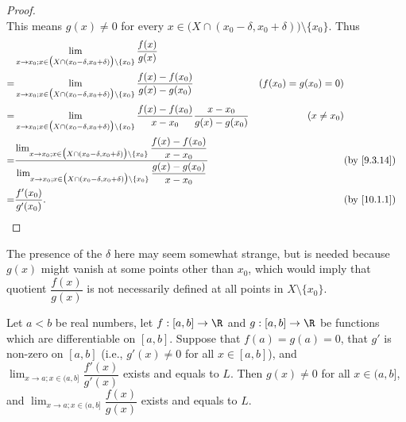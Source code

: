 \begin{proof}
\[  \]
  This means \(g(x) \neq 0\) for every \(x \in \big(X \cap (x_0 - \delta, x_0 + \delta)\big) \setminus \{x_0\}\).
  Thus
  \begin{align*}
      & \lim_{x \to x_0 ; x \in \big(X \cap (x_0 - \delta, x_0 + \delta)\big) \setminus \{x_0\}} \dfrac{f(x)}{g(x)}                                                                                                                                                                                                  \\
    = & \lim_{x \to x_0 ; x \in \big(X \cap (x_0 - \delta, x_0 + \delta)\big) \setminus \{x_0\}} \dfrac{f(x) - f(x_0)}{g(x) - g(x_0)}                                                                                                                            & (f(x_0) = g(x_0) = 0)                             \\
    = & \lim_{x \to x_0 ; x \in \big(X \cap (x_0 - \delta, x_0 + \delta)\big) \setminus \{x_0\}} \dfrac{f(x) - f(x_0)}{x - x_0} \dfrac{x - x_0}{g(x) - g(x_0)}                                                                                                   & (x \neq x_0)                                      \\
    = & \dfrac{\lim_{x \to x_0 ; x \in \big(X \cap (x_0 - \delta, x_0 + \delta)\big) \setminus \{x_0\}} \dfrac{f(x) - f(x_0)}{x - x_0}}{\lim_{x \to x_0 ; x \in \big(X \cap (x_0 - \delta, x_0 + \delta)\big) \setminus \{x_0\}} \dfrac{g(x) - g(x_0)}{x - x_0}} &                       & \text{(by \cref{9.3.14})} \\
    = & \dfrac{f'(x_0)}{g'(x_0)}.                                                                                                                                                                                                                                &                       & \text{(by \cref{10.1.1})}
  \end{align*}
\end{proof}

\begin{note}
  The presence of the \(\delta\) here may seem somewhat strange, but is needed because \(g(x)\) might vanish at some points other than \(x_0\), which would imply that quotient \(\dfrac{f(x)}{g(x)}\) is not necessarily defined at all points in \(X \setminus \{x_0\}\).
\end{note}

\begin{prop}\label{10.5.2}
  Let \(a < b\) be real numbers, let \(f : [a, b] \to \R\) and \(g : [a, b] \to \R\) be functions which are differentiable on \([a, b]\).
  Suppose that \(f(a) = g(a) = 0\), that \(g'\) is non-zero on \([a, b]\) (i.e., \(g'(x) \neq 0\) for all \(x \in [a, b]\)), and \(\lim_{x \to a ; x \in (a, b]} \dfrac{f'(x)}{g'(x)}\) exists and equals to \(L\).
  Then \(g(x) \neq 0\) for all \(x \in (a, b]\), and \(\lim_{x \to a ; x \in (a, b]} \dfrac{f(x)}{g(x)}\) exists and equals to \(L\).
\end{prop}

